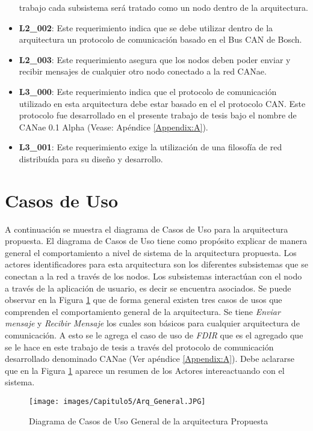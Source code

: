 \begin{itemize}
  trabajo cada subsistema será tratado como un nodo dentro de la arquitectura.
\item\textbf{L2\_002}: Este requerimiento indica que se debe utilizar dentro de
  la arquitectura un protocolo de comunicación basado en el Bus CAN de Bosch.
\item\textbf{L2\_003}: Este requerimiento asegura que los nodos deben poder enviar
  y recibir mensajes de cualquier otro nodo conectado a la red CANae.
\item\textbf{L3\_000}: Este requerimiento indica que el protocolo de
  comunicación utilizado en esta arquitectura debe estar basado en el
  el protocolo CAN. Este protocolo fue desarrollado en el presente
  trabajo de tesis bajo el nombre de CANae 0.1 Alpha (Vease: Apéndice \ref{Appendix:A}).
\item\textbf{L3\_001}: Este requerimiento exige la utilización de una
  filosofía de red distribuída para su diseño y desarrollo.
\end{itemize}

\section{Casos de Uso}
A continuación se muestra el diagrama de Casos de Uso para la arquitectura propuesta.
El diagrama de Casos de Uso tiene como propósito explicar de manera general
el comportamiento a nivel de sistema de la arquitectura propuesta.
Los actores identificadores para esta arquitectura son los diferentes
subsistemas que se conectan a la red a través de los nodos.
Los subsistemas interactúan con el nodo a través de
la aplicación de usuario, es decir se encuentra asociados.
Se puede observar en la Figura \ref{fig:DiagramaCUArqPropuestaGENERAL}
que de forma general existen tres casos de usos que comprenden el comportamiento
general de la arquitectura. Se tiene \textit{Enviar mensaje} y \textit{Recibir
  Mensaje} los cuales son básicos para cualquier arquitectura de comunicación. A
esto se le agrega el caso de uso de \textit{FDIR} que es el agregado que se le
hace en este trabajo de tesis a través del protocolo de comunicación desarrollado
denominado CANae (Ver apéndice \ref{Appendix:A}). Debe aclararse que en 
la Figura \ref{fig:DiagramaCUArqPropuestaGENERAL}
aparece un resumen de los Actores intereactuando con el sistema. 

\begin{figure}[h!]
 \centering
 \texttt{[image: images/Capitulo5/Arq\_General.JPG]}
  \caption{Diagrama de Casos de Uso General de la arquitectura Propuesta}
\label{fig:DiagramaCUArqPropuestaGENERAL}
\end{figure} 

